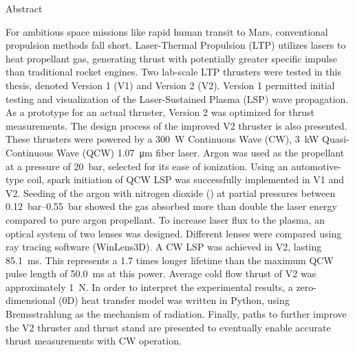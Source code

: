 \begin{plainchp}{Abstract}
    
    For ambitious space missions like rapid human transit to Mars, conventional propulsion methods fall short. Laser-Thermal Propulsion (LTP) utilizes lasers to heat propellant gas, generating thrust with potentially greater specific impulse than traditional rocket engines. Two lab-scale LTP thrusters were tested in this thesis, denoted Version 1 (V1) and Version 2 (V2). Version 1 permitted initial testing and visualization of the Laser-Sustained Plasma (LSP) wave propagation. As a prototype for an actual thruster, Version 2 was optimized for thrust measurements. The design process of the improved V2 thruster is also presented. These thrusters were powered by a \qty{300}{W} Continuous Wave (CW), \qty{3}{kW} Quasi-Continuous Wave (QCW) \qty{1.07}{μm} fiber laser. Argon was used as the propellant at a pressure of \qty{20}{bar}, selected for its ease of ionization. Using an automotive-type coil, spark initiation of QCW LSP was successfully implemented in V1 and V2. Seeding of the argon with nitrogen dioxide () at partial pressures between \qtyrange{.12}{.55}{bar} showed the gas absorbed more than double the laser energy compared to pure argon propellant. To increase laser flux to the plasma, an optical system of two lenses was designed. Different lenses were compared using ray tracing software (WinLens3D). A CW LSP was achieved in V2, lasting \qty{85.1}{ms}. This represents a 1.7 times longer lifetime than the maximum QCW pulse length of \qty{50.0}{ms} at this power. Average cold flow thrust of V2 was approximately \qty{1}{N}. In order to interpret the experimental results, a zero-dimensional (0D) heat transfer model was written in Python, using Bremsstrahlung as the mechanism of radiation. Finally, paths to further improve the V2 thruster and thrust stand are presented to eventually enable accurate thrust measurements with CW operation.

\end{plainchp}